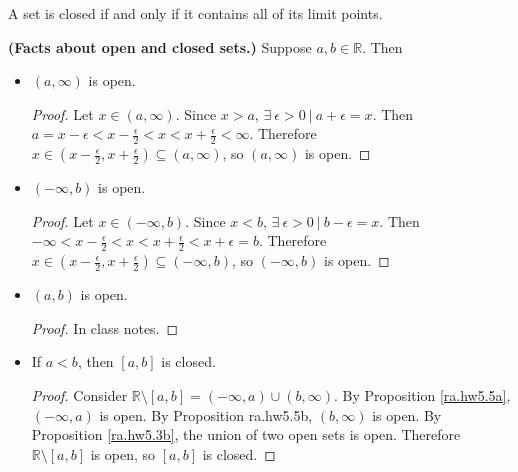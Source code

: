 \begin{theorem} A set is closed if and only if it contains all of its limit points.

\end{theorem}

\textbf{(Facts about open and closed sets.)} Suppose \(a, b \in \mathbb{R}\). Then

\begin{itemize}

\item \begin{proposition}\label{ra.hw5.5b} \((a, \infty)\) is open. \end{proposition}

\begin{proof} Let \(x \in (a, \infty)\). Since \(x > a\), \(\exists \ \epsilon >0 \ | \ a +  \epsilon = x\). Then \(a = x - \epsilon < x - \frac{\epsilon}{2} < x < x + \frac{\epsilon}{2} < \infty\). Therefore \(x \in (x - \frac{\epsilon}{2}, x + \frac{\epsilon}{2}) \subseteq (a, \infty)\), so \((a, \infty)\) is open. \end{proof}

\item \begin{proposition}\label{ra.hw5.5a} \((-\infty, b)\) is open. \end{proposition}

\begin{proof} Let \(x \in (-\infty, b)\). Since \(x < b\), \(\exists \ \epsilon >0 \ | \ b - \epsilon = x\). Then \(-\infty < x - \frac{\epsilon}{2} < x < x + \frac{\epsilon}{2} < x + \epsilon = b\). Therefore \(x \in (x - \frac{\epsilon}{2}, x + \frac{\epsilon}{2}) \subseteq (-\infty, b)\), so \((-\infty, b)\) is open. \end{proof}

\item \begin{proposition}\((a, b)\) is open. \end{proposition}

\begin{proof} In class notes. \end{proof}

\item \begin{proposition}\label{ra.hw5.5c} If \(a < b\), then \([a, b]\) is closed. \end{proposition} 

\begin{proof} Consider \(\mathbb{R} \setminus [a, b] = (-\infty, a) \cup (b, \infty)\). By Proposition \ref{ra.hw5.5a}, \((-\infty, a) \) is open. By Proposition {ra.hw5.5b}, \((b, \infty)\) is open. By Proposition \ref{ra.hw5.3b}, the union of two open sets is open. Therefore \(\mathbb{R} \setminus [a, b]\) is open, so \([a, b]\) is closed. \end{proof}


\end{itemize}
